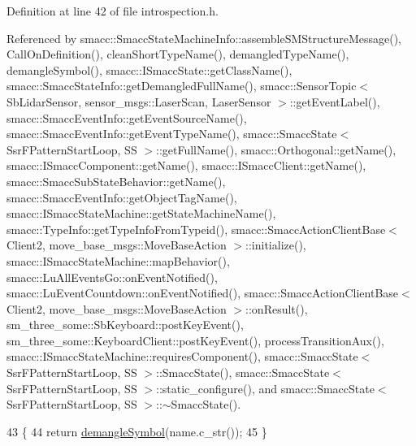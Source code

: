 Definition at line 42 of file introspection.\+h.



Referenced by smacc\+::\+Smacc\+State\+Machine\+Info\+::assemble\+S\+M\+Structure\+Message(), Call\+On\+Definition(), clean\+Short\+Type\+Name(), demangled\+Type\+Name(), demangle\+Symbol(), smacc\+::\+I\+Smacc\+State\+::get\+Class\+Name(), smacc\+::\+Smacc\+State\+Info\+::get\+Demangled\+Full\+Name(), smacc\+::\+Sensor\+Topic$<$ Sb\+Lidar\+Sensor, sensor\+\_\+msgs\+::\+Laser\+Scan, Laser\+Sensor $>$\+::get\+Event\+Label(), smacc\+::\+Smacc\+Event\+Info\+::get\+Event\+Source\+Name(), smacc\+::\+Smacc\+Event\+Info\+::get\+Event\+Type\+Name(), smacc\+::\+Smacc\+State$<$ Ssr\+F\+Pattern\+Start\+Loop, S\+S $>$\+::get\+Full\+Name(), smacc\+::\+Orthogonal\+::get\+Name(), smacc\+::\+I\+Smacc\+Component\+::get\+Name(), smacc\+::\+I\+Smacc\+Client\+::get\+Name(), smacc\+::\+Smacc\+Sub\+State\+Behavior\+::get\+Name(), smacc\+::\+Smacc\+Event\+Info\+::get\+Object\+Tag\+Name(), smacc\+::\+I\+Smacc\+State\+Machine\+::get\+State\+Machine\+Name(), smacc\+::\+Type\+Info\+::get\+Type\+Info\+From\+Typeid(), smacc\+::\+Smacc\+Action\+Client\+Base$<$ Client2, move\+\_\+base\+\_\+msgs\+::\+Move\+Base\+Action $>$\+::initialize(), smacc\+::\+I\+Smacc\+State\+Machine\+::map\+Behavior(), smacc\+::\+Lu\+All\+Events\+Go\+::on\+Event\+Notified(), smacc\+::\+Lu\+Event\+Countdown\+::on\+Event\+Notified(), smacc\+::\+Smacc\+Action\+Client\+Base$<$ Client2, move\+\_\+base\+\_\+msgs\+::\+Move\+Base\+Action $>$\+::on\+Result(), sm\+\_\+three\+\_\+some\+::\+Sb\+Keyboard\+::post\+Key\+Event(), sm\+\_\+three\+\_\+some\+::\+Keyboard\+Client\+::post\+Key\+Event(), process\+Transition\+Aux(), smacc\+::\+I\+Smacc\+State\+Machine\+::requires\+Component(), smacc\+::\+Smacc\+State$<$ Ssr\+F\+Pattern\+Start\+Loop, S\+S $>$\+::\+Smacc\+State(), smacc\+::\+Smacc\+State$<$ Ssr\+F\+Pattern\+Start\+Loop, S\+S $>$\+::static\+\_\+configure(), and smacc\+::\+Smacc\+State$<$ Ssr\+F\+Pattern\+Start\+Loop, S\+S $>$\+::$\sim$\+Smacc\+State().


\begin{DoxyCode}
43 \{
44     \textcolor{keywordflow}{return} \hyperlink{namespacesmacc_a4dd421d5d4e7617fcf4a9a756797adda}{demangleSymbol}(name.c\_str());
45 \}
\end{DoxyCode}


